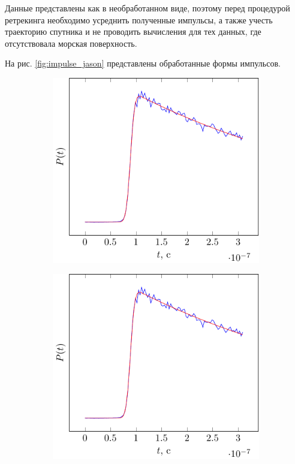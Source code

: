 Данные представлены как в необработанном виде, поэтому перед процедурой ретрекинга необходимо усреднить полученные импульсы, а также учесть траекторию спутника и
не проводить вычисления для тех данных, где отсутствовала морская поверхность.


На рис. \ref{fig:impulse_jason} представлены обработанные формы импульсов. 
\begin{figure}[ht]
    \centering
    \begin{subfigure}{0.49\linewidth}
        \centering
        \includegraphics[width=\linewidth, page=1]{fig/retracking/real}
    \end{subfigure}
    \begin{subfigure}{0.49\linewidth}
        \centering
        \includegraphics[width=\linewidth, page=2]{fig/retracking/real}

\end{subfigure}
\end{figure}
